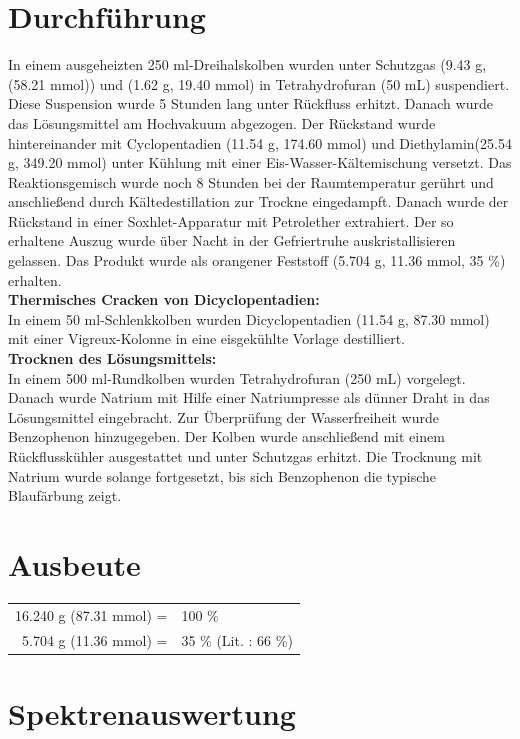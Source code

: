 \documentclass[12pt]{article}
\begin{document}
\begin{onehalfspace}
\normalsize \section{Durchführung \cite{bio}}
In einem ausgeheizten 250 ml-Dreihalskolben wurden unter Schutzgas  (9.43 \si{\gram}, (58.21 \si{\milli\mol})) und  (1.62 \si{\gram}, 19.40 \si{\milli\mol}) in Tetrahydrofuran (50 \si{\milli\liter}) suspendiert. Diese Suspension wurde 5 Stunden lang unter Rückfluss erhitzt. Danach wurde das Lösungsmittel am Hochvakuum abgezogen. Der Rückstand wurde hintereinander mit Cyclopentadien (11.54 \si{\gram}, 174.60 \si{\milli\mol}) und Diethylamin(25.54 \si{\gram}, 349.20 \si{\milli\mol}) unter Kühlung mit einer Eis-Wasser-Kältemischung versetzt. Das Reaktionsgemisch wurde noch 8 Stunden bei der Raumtemperatur gerührt und anschließend durch Kältedestillation zur Trockne eingedampft. Danach wurde der Rückstand in einer Soxhlet-Apparatur mit Petrolether extrahiert. Der so erhaltene Auszug wurde über Nacht in der Gefriertruhe auskristallisieren gelassen. Das Produkt wurde als orangener Feststoff (5.704 \si{\gram}, 11.36 \si{\milli\mol}, 35 \%) erhalten.\\
\noindent
\textbf{Thermisches Cracken von Dicyclopentadien:}\\
In einem 50 ml-Schlenkkolben wurden Dicyclopentadien (11.54 \si{\gram}, 87.30 \si{\milli\mol}) mit einer Vigreux-Kolonne in eine eisgekühlte Vorlage destilliert. \\
\noindent
\textbf{Trocknen des Lösungsmittels:}\\
\noindent
In einem 500 ml-Rundkolben wurden Tetrahydrofuran (250 \si{\milli\liter}) vorgelegt.
Danach wurde Natrium mit Hilfe einer Natriumpresse als dünner Draht in das Lösungsmittel eingebracht. 
Zur Überprüfung der Wasserfreiheit wurde Benzophenon hinzugegeben. Der Kolben wurde anschließend mit einem Rückflusskühler ausgestattet und unter Schutzgas erhitzt. Die Trocknung mit Natrium wurde solange fortgesetzt, bis sich Benzophenon die typische Blaufärbung zeigt.
\section{Ausbeute}
\begin{tabular}{ rl}
  16.240 g (87.31 \si{\milli\mol}) =  & 100 \%\\
  5.704 g (11.36 \si{\milli\mol}) =  & 35 \% (Lit.\cite{bio} : 66 \%) \\
 \end{tabular}
\section{Spektrenauswertung}


\end{onehalfspace}
\end{document}

